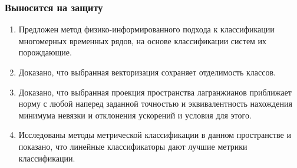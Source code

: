 \documentclass{beamer}
\begin{document}
\begin{frame}
\frametitle{Выносится на защиту}

\begin{enumerate}
    \item Предложен метод физико-информированного подхода к классификации многомерных временных рядов, на основе классификации систем их порождающие.
    \item Доказано, что выбранная векторизация сохраняет отделимость классов.
    \item Доказано, что выбранная проекция пространства лагранжианов приближает норму с любой наперед заданной точностью и эквивалентность нахождения минимума невязки и отклонения ускорений и условия для этого.
    \item Исследованы методы метрической классификации в данном пространстве и показано, что линейные классификаторы дают лучшие метрики классификации. 
\end{enumerate}
\end{frame}
\end{document}
